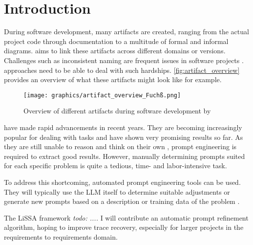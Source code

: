 
\chapter{Introduction}
\label{ch:Introduction}
During software development, many artifacts are created, ranging from the actual project code through documentation to a multitude of formal and informal diagrams. \TLR aims to link these artifacts across different domains or versions. Challenges such as inconsistent naming are frequent issues in software projects \cite{wohlrab2019ImprovingConsistency}. \TLR approaches need to be able to deal with such hardships. \autoref{fig:artifact_overview} provides an overview of what these artifacts might look like for example.

\begin{figure}
    \centering
    \texttt{[image: graphics/artifact\_overview\_Fuchß.png]}
    \caption{Overview of different artifacts during software development by }
    \label{fig:artifact_overview}
\end{figure}

\LLMs have made rapid advancements in recent years. They are becoming increasingly popular for dealing with \TLR tasks and have shown very promising results so far. As they are still unable to reason and think on their own \cite{shojaee2025IllusionThinking}, prompt engineering is required to extract good results. However, manually determining prompts suited for each specific problem is quite a tedious, time- and labor-intensive task.

To address this shortcoming, automated prompt engineering tools can be used. They will typically use the LLM itself to determine suitable adjustments or generate new prompts based on a description or training data of the problem \cite{ramnath2025SystematicSurvey}.

The LiSSA framework \cite{fuchss2025LiSSAGeneric} \textit{todo: ....}
I will contribute an automatic prompt refinement algorithm, hoping to improve trace recovery, especially for larger projects in the requirements to requirements domain.
